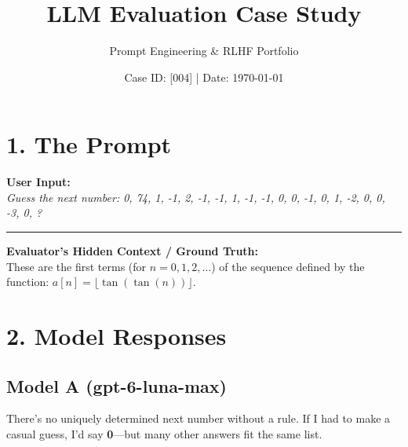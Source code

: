\documentclass[11pt, a4paper]{article}
\title{\textbf{LLM Evaluation Case Study}}
\author{Prompt Engineering \& RLHF Portfolio}
\date{Case ID: [004] | Date: \today}
\begin{document}
\maketitle

\section*{1. The Prompt}
\noindent
\begin{mdframed}[backgroundcolor=promptcolor, linecolor=gray!50, roundcorner=5pt, innertopmargin=10pt, innerbottommargin=10pt, innerleftmargin=10pt, innerrightmargin=10pt]
\textbf{User Input:} \\[0.2cm]
\textit{Guess the next number: 0, 74, 1, -1, 2, -1, -1, 1, -1, -1, 0, 0, -1, 0, 1, -2, 0, 0, -3, 0, ?}

\vspace{0.3cm}
\hrule
\vspace{0.3cm}

\textbf{Evaluator's Hidden Context / Ground Truth:} \\
These are the first terms (for $n=0, 1, 2, \dots$) of the sequence defined by the function: $a[n] = \lfloor \tan(\tan(n)) \rfloor$.
\end{mdframed}

\vspace{0.5cm}

\section*{2. Model Responses}

\subsection*{Model A (gpt-6-luna-max)}
\noindent
\begin{mdframed}[backgroundcolor=modelAcolor, linecolor=blue!20, roundcorner=5pt, innertopmargin=10pt, innerbottommargin=10pt, innerleftmargin=10pt, innerrightmargin=10pt]
There's no uniquely determined next number without a rule. If I had to make a casual guess, I'd say \textbf{0}---but many other answers fit the same list.
\end{mdframed}

\vspace{0.5cm}
\end{document}
